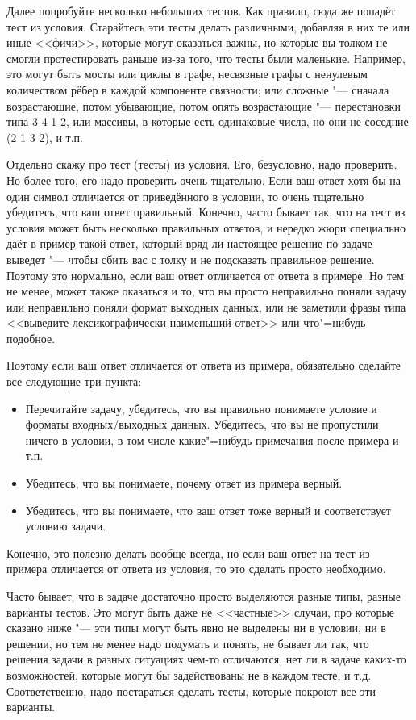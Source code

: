 \documentclass[a4paper,10pt]{problems}
\begin{document}
Далее попробуйте несколько небольших тестов. Как правило, сюда же попадёт тест из условия. 
Старайтесь эти тесты делать различными, добавляя в них те или иные <<фичи>>, которые могут оказаться важны, 
но которые вы толком не смогли протестировать раньше из-за того, что тесты были маленькие. 
Например, это могут быть мосты или циклы в графе, несвязные графы с ненулевым количеством рёбер в каждой компоненте связности; 
или сложные "--- сначала возрастающие, потом убывающие, потом опять возрастающие "--- перестановки типа 3 4 1 2, или массивы, в которые есть одинаковые числа, 
но они не соседние (2 1 3 2), и т.п.

 Отдельно скажу про тест (тесты) из условия. Его, безусловно, надо проверить. 
Но более того, его надо проверить очень тщательно.
Если ваш ответ хотя бы на один символ отличается от приведённого в условии, то очень тщательно убедитесь, что ваш ответ правильный.
Конечно, часто бывает так, что на тест из условия может быть несколько правильных ответов, и нередко жюри специально даёт в пример такой ответ,
который вряд ли настоящее решение по задаче выведет "--- чтобы сбить вас с толку и не подсказать правильное решение.
Поэтому это нормально, если ваш ответ отличается от ответа в примере.
Но тем не менее, может также оказаться и то, что вы просто неправильно поняли задачу или неправильно поняли формат выходных данных,
или не заметили фразы типа <<выведите лексикографически наименьший ответ>> или что"=нибудь подобное.

Поэтому если ваш ответ отличается от ответа из примера, обязательно сделайте все следующие три пункта:
\begin{itemize}
\item Перечитайте задачу, убедитесь, что вы правильно понимаете условие и форматы входных/выходных данных. 
Убедитесь, что вы не пропустили ничего в условии, в том числе какие"=нибудь примечания после примера и т.п.
\item Убедитесь, что вы понимаете, почему ответ из примера верный.
\item Убедитесь, что вы понимаете, что ваш ответ тоже верный и соответствует условию задачи.
\end{itemize}
Конечно, это полезно делать вообще всегда, но если ваш ответ на тест из примера отличается от ответа из условия, то это сделать просто необходимо.

Часто бывает, что в задаче достаточно просто выделяются разные типы, разные варианты тестов. 
Это могут быть даже не <<частные>> случаи, про которые сказано ниже "--- эти типы могут быть явно не выделены
ни в условии, ни в решении, но тем не менее надо подумать и понять, не бывает ли так, что решения задачи в разных ситуациях
чем-то отличаются, нет ли в задаче каких-то возможностей, которые могут бы задействованы не в каждом тесте, и т.д.
Соответственно, надо постараться сделать тесты, которые покроют все эти варианты.
\end{document}

